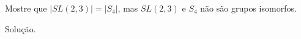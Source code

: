 \begin{homeworkProblem}
  Mostre que $|SL(2,3)| = |S_4|$, mas $SL(2,3)$ e $S_4$ não são grupos isomorfos.
  \begin{solution}
    Solução.
  \end{solution}
\end{homeworkProblem}
